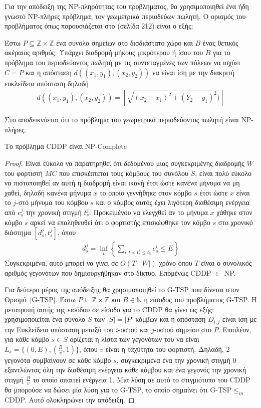 Για την απόδειξη της NP-πληρότητας του προβλήματος, θα χρησιμοποιηθεί ένα ήδη γνωστό NP-πλήρες πρόβλημα, τον γεωμετρικά περιοδεύων πωλητή. Ο ορισμός του προβλήματος
όπως παρουσιάζεται στο \cite{Garey_Johnson} (σελίδα 212) είναι ο εξής:
\begin{definition}
\label{G-TSP} 
Έστω $P \subseteq \mathbb{Z} \times \mathbb{Z}$ ένα σύνολο σημείων στο δισδιάστατο χώρο και $B$ ένας θετικός ακέραιος αριθμός.
Υπάρχει διαδρομή μήκους μικρότερου ή ίσου του $B$ για το πρόβλημα του περιοδεύοντος πωλητή με τις συντεταγμένες των πόλεων να ισχύει $C=P$ και η απόσταση
$d((x_{1},y_{1}),(x_{2},y_{2}))$ να είναι ίση με την διακριτή ευκλείδεια απόσταση δηλαδή
\begin{align*}
d((x_{1},y_{1}),(x_{2},y_{2})) = [\sqrt{(x_{2}-x_{1})^{2} + (Y_{2}-y_{1})^{2})}]
\end{align*}
\end{definition}
Στο \cite{PapadimitriouNP} αποδεικνύεται ότι το πρόβλημα του γεωμετρικά περιοδεύοντος πωλητή είναι NP-πλήρες.
\begin{theorem}\label{th:np-complete}
Το πρόβλημα CDDP είναι NP-Complete
\end{theorem}
\begin{proof}
Είναι εύκολο να παρατηρηθεί ότι δεδομένου μιας συγκεκριμένης διαδρομής $W$ του φορτιστή $MC$ που επισκέπτεται τους κόμβους του συνόλου $S$, είναι πολύ εύκολο να
πιστοποιηθεί αν αυτή η διαδρομή είναι ικανή έτσι ώστε κανένα μήνυμα να μη χαθεί, δηλαδή κανένα μήνυμα $x$ το οποίο γεννήθηκε στον κόμβο $s$ έτσι ώστε $x$ είναι το
$j$-στό μήνυμα του κόμβου $s$ και ο κόμβος αυτός έχει λιγότερη διαθέσιμη ενέργεια από $e^{j}_{s}$ την χρονική στιγμή $t^{j}_{s}$. Προκειμένου να ελεγχθεί αν το μήνυμα
$x$ χάθηκε στον κόμβο $s$ αρκεί να επαληθευθεί ότι ο φορτιστής επισκέφθηκε τον κόμβο $s$ στο χρονικό διάστημα $[d_s^j, t_s^j]$, όπου
\begin{align*}
d_s^j = \inf_t\left\{ \sum_{i: t < t_s^i \leq t_s^j} e_s^{i} \leq E \right\}
\end{align*}
Συγκεκριμένα, αυτό μπορεί να γίνει σε $O(T \cdot |W|)$ χρόνο όπου $T$ είναι ο συνολικός αριθμός γεγονότων που δημιουργήθηκαν στο δίκτυο. Επομένως CDDP $\in$ NP.

Για δεύτερο μέρος της απόδειξης θα χρησιμοποιηθεί το G-TSP που δίνεται στον Ορισμό~\ref{G-TSP}. Έστω $P \subseteq \mathbb{Z} \times \mathbb{Z}$ και $Β\in
\mathbb{N}$ η είσοδος του προβλήματος G-TSP. Η μετατροπή αυτής της εισόδου σε είσοδο για το CDDP θα γίνει ως εξής: χρησιμοποιείται ένα σύνολο $S$ των $|S|=|P|$
κόμβων και η απόσταση $D_{i,j}$ είναι ίση με την Ευκλείδεια απόσταση μεταξύ του $i$-οστού και $j$-οστού σημείου στο $P$. Επιπλέον, για κάθε κόμβο $s\in S$
ορίζεται η λίστα των γεγονότων του να είναι $L_{s} = \{(0, E), (\frac{B}{v}, 1)\}$, όπου $v$ είναι η ταχύτητα του φορτιστή. Δηλαδή, 2 γεγονότα συμβαίνουν σε κάθε
κόμβο $s$, συγκεκριμένα ένα την χρονική στιγμή 0 εξαντλώντας όλη την διαθέσιμη ενέργεια κάθε κόμβου και ένα γεγονός την χρονική στιγμή $\frac{B}{v}$ το οποίο
απαιτεί ενέργεια 1. Μια λύση σε αυτό το στιγμιότυπο του CDDP θα μπορούσε να δώσει μία λύση για το G-TSP, το οποίο σημαίνει ότι G-TSP$\leq_{m}$CDDP. Αυτό ολοκληρώνει
την απόδειξη.
\end{proof}

